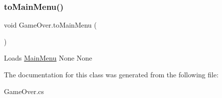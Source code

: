 \subsubsection{\texorpdfstring{to\+Main\+Menu()}{toMainMenu()}}
{\footnotesize\ttfamily void Game\+Over.\+to\+Main\+Menu (\begin{DoxyParamCaption}{ }\end{DoxyParamCaption})\hspace{0.3cm}{\ttfamily [inline]}}

Loads \mbox{\hyperlink{class_main_menu}{Main\+Menu}}  None  None 

The documentation for this class was generated from the following file\+:\begin{DoxyCompactItemize}
\item 
Game\+Over.\+cs\end{DoxyCompactItemize}
